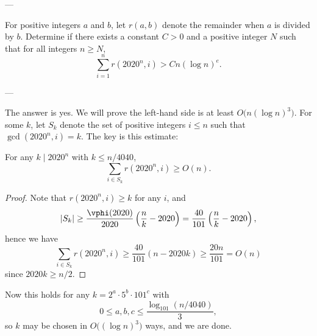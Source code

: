 
---

For positive integers $a$ and $b$, let $r(a,b)$ denote the remainder when $a$ is divided by $b$. Determine if there exists a constant $C>0$ and a positive integer $N$ such that for all integers $n\ge N$, \[\sum_{i=1}^nr(2020^n,i)>Cn(\log n)^e.\]

---

The answer is yes. We will prove the left-hand side is at least $O\big(n(\log n)^3\big)$. For some $k$, let $S_k$ denote the set of positive integers $i\le n$ such that $\gcd(2020^n,i)=k$. The key is this estimate:
\begin{iclaim*}
    For any $k\mid2020^n$ with $k\le n/4040$, \[\sum_{i\in S_k}r(2020^n,i)\ge O(n).\]
\end{iclaim*}
\begin{proof}
    Note that $r(2020^n,i)\ge k$ for any $i$, and \[|S_k|\ge\frac{\vphi(2020)}{2020}\left(\frac nk-2020\right)=\frac{40}{101}\left(\frac nk-2020\right),\]
    hence we have \[\sum_{i\in S_k}r(2020^n,i)\ge\frac{40}{101}(n-2020k)\ge\frac{20n}{101}=O(n)\]
    since $2020k\ge n/2$.
\end{proof}

Now this holds for any $k=2^a\cdot5^b\cdot101^c$ with \[0\le a,b,c\le\frac{\log_{101}(n/4040)}3,\]
so $k$ may be chosen in $O\big( (\log n)^3\big)$ ways, and we are done.


